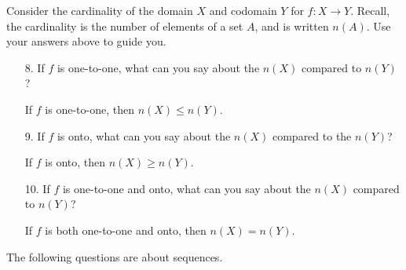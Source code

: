 \documentclass{article}
\begin{document}
\noindent
Consider the cardinality of the domain $X$ and codomain $Y$ for $f:X \to Y$.  Recall, the cardinality is the number of elements of a set $A$, and is written $n(A)$.  Use your answers above to guide you. 

\begin{itemize}
    \item[8.] If $f$ is one-to-one, what can you say about the $n(X)$ compared to $n(Y)$?
    
    {\color{blue} If $f$ is one-to-one, then $n(X) \leq n(Y)$.}
    
    \item[9.] If $f$ is onto, what can you say about the $n(X)$ compared to the $n(Y)$?
    
    {\color{blue} If $f$ is onto, then $n(X) \geq n(Y)$.}
    
    \item[10.] If $f$ is one-to-one and onto, what can you say about the $n(X)$ compared to $n(Y)$?
    
    {\color{blue} If $f$ is both one-to-one and onto, then $n(X)=n(Y)$.}
\end{itemize}

\noindent
The following questions are about sequences.
\end{document}
